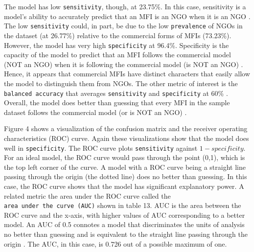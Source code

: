 \documentclass[a4paper,nobind]{templates/ociamthesis}
\begin{document}
The model has low \texttt{sensitivity}, though, at 23.75\%. In this case, sensitivity is a model's ability to accurately predict that an MFI is an NGO when it is an NGO \autocite{marom2010using}. The low \texttt{sensitivity} could, in part, be due to the low \texttt{prevalence} of NGOs in the dataset (at 26.77\%) relative to the commercial forms of MFIs (73.23\%). However, the model has very high \texttt{specificity} at 96.4\%. Specificity is the capacity of the model to predict that an MFI follows the commercial model (NOT an NGO) when it is following the commercial model (is NOT an NGO) \autocite{zeng2020confusion}. Hence, it appears that commercial MFIs have distinct characters that easily allow the model to distinguish them from NGOs. The other metric of interest is the \texttt{balanced\ accuracy} that averages \texttt{sensitivity} and \texttt{specificity} at 60\% \autocite{gorzalczany2016multi}. Overall, the model does better than guessing that every MFI in the sample dataset follows the commercial model (or is NOT an NGO) \autocite{hosmer2013applied}.

Figure 4 shows a visualization of the confusion matrix and the receiver operating characteristics (ROC) curve. Again these visualizations show that the model does well in \texttt{specificity}. The ROC curve plots \texttt{sensitivity} against \(1 - specificity\). For an ideal model, the ROC curve would pass through the point (0,1), which is the top left corner of the curve. A model with a ROC curve being a straight line passing through the origin (the dotted line) does no better than guessing. In this case, the ROC curve shows that the model has significant explanatory power. A related metric the area under the ROC curve called the \texttt{area\ under\ the\ curve\ (AUC)} shown in table 13. AUC is the area between the ROC curve and the x-axis, with higher values of AUC corresponding to a better model. An AUC of 0.5 connotes a model that discriminates the units of analysis no better than guessing and is equivalent to the straight line passing through the origin \autocite{mandrekar2010receiver}. The AUC, in this case, is 0.726 out of a possible maximum of one.
\end{document}
